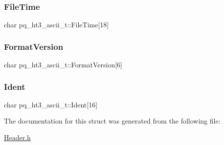 \subsubsection{\texorpdfstring{File\+Time}{FileTime}}
{\footnotesize\ttfamily char pq\+\_\+ht3\+\_\+ascii\+\_\+t\+::\+File\+Time\mbox{[}18\mbox{]}}

\mbox{\label{structpq__ht3__ascii__t_ab0a74839197fdc3ac0bda27fbcb0cf0e}} 
\subsubsection{\texorpdfstring{Format\+Version}{FormatVersion}}
{\footnotesize\ttfamily char pq\+\_\+ht3\+\_\+ascii\+\_\+t\+::\+Format\+Version\mbox{[}6\mbox{]}}

\mbox{\label{structpq__ht3__ascii__t_ae3a8c20334e0edc651a1ae9b8cd566aa}} 
\subsubsection{\texorpdfstring{Ident}{Ident}}
{\footnotesize\ttfamily char pq\+\_\+ht3\+\_\+ascii\+\_\+t\+::\+Ident\mbox{[}16\mbox{]}}



The documentation for this struct was generated from the following file\+:\begin{DoxyCompactItemize}
\item 
\hyperlink{_header_8h}{Header.\+h}\end{DoxyCompactItemize}
